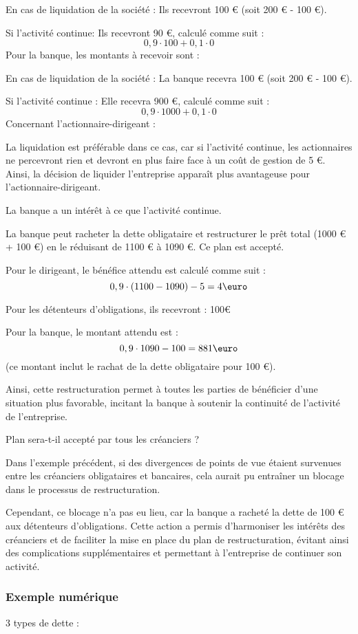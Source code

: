 \documentclass[a4paper, 12pt]{report}
\begin{document}
En cas de liquidation de la société : Ils recevront 100 € (soit 200 € - 100 €).

Si l'activité continue: Ils recevront 90 €, calculé comme suit : 
$$
0,9 \cdot 100 + 0,1 \cdot 0
$$
Pour la banque, les montants à recevoir sont :

En cas de liquidation de la société : La banque recevra 100 € (soit 200 € - 100 €).

Si l'activité continue : Elle recevra 900 €, calculé comme suit : 
$$
0,9 \cdot 1000 + 0,1 \cdot 0 
$$
Concernant l'actionnaire-dirigeant :

La liquidation est préférable dans ce cas, car si l'activité continue, les actionnaires ne percevront rien et devront en plus faire face à un coût de gestion de 5 €. Ainsi, la décision de liquider l'entreprise apparaît plus avantageuse pour l'actionnaire-dirigeant.

La banque a un intérêt à ce que l'activité continue.

La banque peut racheter la dette obligataire et restructurer le prêt total (1000 € + 100 €) en le réduisant de 1100 € à 1090 €. Ce plan est accepté.

Pour le dirigeant, le bénéfice attendu est calculé comme suit :
$$
0,9\cdot(1100-1090)-5=4 \text{\euro}
$$

Pour les détenteurs d'obligations, ils recevront : 100\euro

Pour la banque, le montant attendu est :
$$
0,9\cdot 1090-100 =881\text{\euro}
$$
(ce montant inclut le rachat de la dette obligataire pour 100 €).

Ainsi, cette restructuration permet à toutes les parties de bénéficier d'une situation plus favorable, incitant la banque à soutenir la continuité de l'activité de l'entreprise.

Plan sera-t-il accepté par tous les créanciers ? 

Dans l'exemple précédent, si des divergences de points de vue étaient survenues entre les créanciers obligataires et bancaires, cela aurait pu entraîner un blocage dans le processus de restructuration. 

Cependant, ce blocage n'a pas eu lieu, car la banque a racheté la dette de 100 € aux détenteurs d'obligations. Cette action a permis d'harmoniser les intérêts des créanciers et de faciliter la mise en place du plan de restructuration, évitant ainsi des complications supplémentaires et permettant à l'entreprise de continuer son activité.

\subsubsection{Exemple numérique}
3 types de dette :
\end{document}
